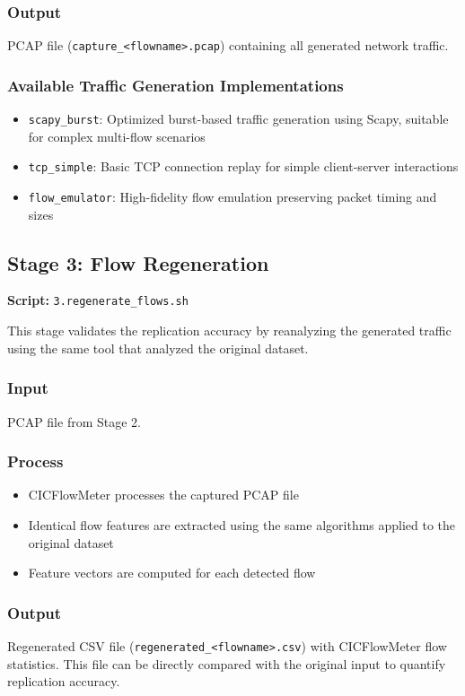 \documentclass[11pt,a4paper]{article}
\begin{document}
\subsubsection{Output}
PCAP file (\texttt{capture\_<flowname>.pcap}) containing all generated network traffic.

\subsubsection{Available Traffic Generation Implementations}
\begin{itemize}
    \item \texttt{scapy\_burst}: Optimized burst-based traffic generation using Scapy, suitable for complex multi-flow scenarios
    \item \texttt{tcp\_simple}: Basic TCP connection replay for simple client-server interactions
    \item \texttt{flow\_emulator}: High-fidelity flow emulation preserving packet timing and sizes
\end{itemize}

\subsection{Stage 3: Flow Regeneration}

\textbf{Script:} \texttt{3.regenerate\_flows.sh}

This stage validates the replication accuracy by reanalyzing the generated traffic using the same tool that analyzed the original dataset.

\subsubsection{Input}
PCAP file from Stage 2.

\subsubsection{Process}
\begin{itemize}
    \item CICFlowMeter processes the captured PCAP file
    \item Identical flow features are extracted using the same algorithms applied to the original dataset
    \item Feature vectors are computed for each detected flow
\end{itemize}

\subsubsection{Output}
Regenerated CSV file (\texttt{regenerated\_<flowname>.csv}) with CICFlowMeter flow statistics. This file can be directly compared with the original input to quantify replication accuracy.
\end{document}

